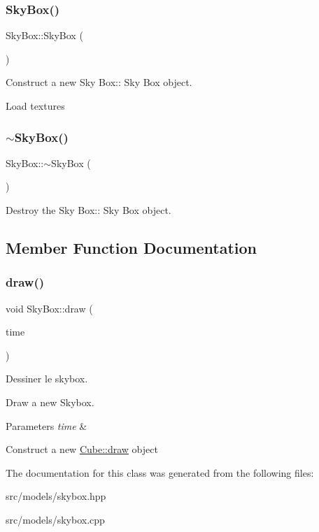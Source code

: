 \subsubsection{\texorpdfstring{SkyBox()}{SkyBox()}}
{\footnotesize\ttfamily Sky\+Box\+::\+Sky\+Box (\begin{DoxyParamCaption}{ }\end{DoxyParamCaption})}



Construct a new Sky Box\+:\+: Sky Box object. 

Load textures \mbox{\label{classSkyBox_aef6a9b7d384358fd2095d1e171d8a997}} 
\subsubsection{\texorpdfstring{$\sim$SkyBox()}{~SkyBox()}}
{\footnotesize\ttfamily Sky\+Box\+::$\sim$\+Sky\+Box (\begin{DoxyParamCaption}{ }\end{DoxyParamCaption})}



Destroy the Sky Box\+:\+: Sky Box object. 



\subsection{Member Function Documentation}
\mbox{\label{classSkyBox_ab4690616f1ceefd833d3ce68be01e50c}} 
\subsubsection{\texorpdfstring{draw()}{draw()}}
{\footnotesize\ttfamily void Sky\+Box\+::draw (\begin{DoxyParamCaption}\item[{G\+Luint}]{time }\end{DoxyParamCaption})}



Dessiner le skybox. 

Draw a new Skybox.


\begin{DoxyParams}{Parameters}
{\em time} & \\
\hline
\end{DoxyParams}
Construct a new \mbox{\hyperlink{classCube_ab26b72a81376fd5dc4fcc7f0b715b087}{Cube\+::draw}} object 

The documentation for this class was generated from the following files\+:\begin{DoxyCompactItemize}
\item 
src/models/skybox.\+hpp\item 
src/models/skybox.\+cpp\end{DoxyCompactItemize}
